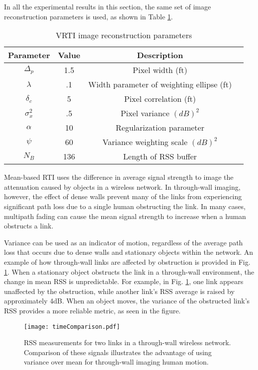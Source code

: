 \documentclass[journal]{IEEEtran}
\begin{document}
In all the experimental results in this section, the same set of image reconstruction parameters is used, as shown in Table \ref{table.reconstructionParams}.

\begin{table}[htp]
\centering
\begin{tabular}{|c|c|c|c|}
\hline
\textbf{Parameter} & \textbf{Value} & \textbf{Description} \\ \hline
$\Delta_p$ & 1.5 & Pixel width (ft) \\ \hline
$\lambda$ & .1 & Width parameter of weighting ellipse (ft) \\ \hline
$\delta_c$ & 5 & Pixel correlation (ft) \\ \hline
$\sigma_x^2$ & .5 & Pixel variance $(dB)^2$ \\ \hline
$\alpha$ & 10 & Regularization parameter\\ \hline
$\psi$ & 60 & Variance weighting scale $(dB)^2$\\ \hline
$N_B$ & 136 & Length of RSS buffer \\ \hline
\end{tabular}
\caption{VRTI image reconstruction parameters}
\label{table.reconstructionParams}
\end{table}

Mean-based RTI \cite{Wilson09a} uses the difference in average signal strength to image the attenuation caused by objects in a wireless network. In through-wall imaging, however, the effect of dense walls prevent many of the links from experiencing significant path loss due to a single human obstructing the link. In many cases, multipath fading can cause the mean signal strength to increase when a human obstructs a link.

Variance can be used as an indicator of motion, regardless of the average path loss that occurs due to dense walls and stationary objects within the network. An example of how through-wall links are affected by obstruction is provided in Fig. \ref{fig.timeComparison}.  When a stationary object obstructs the link in a through-wall environment, the change in mean RSS is unpredictable. For example, in Fig. \ref{fig.timeComparison}, one link appears unaffected by the obstruction, while another link's RSS average is raised by approximately 4dB. When an object moves, the variance of the obstructed link's RSS provides a more reliable metric, as seen in the figure.

\begin{figure}[htp]
\centering
\texttt{[image: timeComparison.pdf]}
\caption{RSS measurements for two links in a through-wall wireless network. Comparison of these signals illustrates the advantage of using variance over mean for through-wall imaging human motion.}
\label{fig.timeComparison}
\end{figure}
\end{document}
